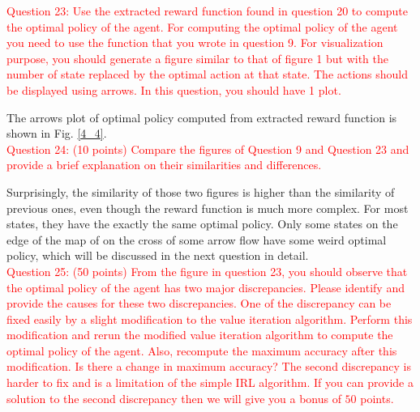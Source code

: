 \documentclass[11pt]{article}
\begin{document}
\textcolor{red}{
    Question 23: Use the extracted reward function found in question 20 to compute the optimal policy of the agent. For computing the optimal policy of the agent you need to use the function that you wrote in question 9. For visualization purpose, you should generate a figure similar to that of figure 1 but with the number of state replaced by the optimal action at that state. The actions should be displayed using arrows. In this question, you should have 1 plot.
}

The arrows plot of optimal policy computed from extracted reward function is shown in Fig. \ref{4_4}.\\

\textcolor{red}{
    Question 24: (10 points) Compare the figures of Question 9 and Question 23 and provide a brief explanation on their similarities and differences.
}

Surprisingly, the similarity of those two figures is higher than the similarity of previous ones, even though the reward function is much more complex. For most states, they have the exactly the same optimal policy. Only some states on the edge of the map of on the cross of some arrow flow have some weird optimal policy, which will be discussed in the next question in detail.\\

\textcolor{red}{
    Question 25: (50 points) From the figure in question 23, you should observe that the optimal policy of the agent has two major discrepancies. Please identify and provide the causes for these two discrepancies. One of the discrepancy can be fixed easily by a slight modification to the value iteration algorithm. Perform this modification and rerun the modified value iteration algorithm to compute the optimal policy of the agent. Also, recompute the maximum accuracy after this modification. Is there a change in maximum accuracy? The second discrepancy is harder to fix and is a limitation of the simple IRL algorithm. If you can provide a solution to the second discrepancy then we will give you a bonus of $50$ points.
}
\end{document}
